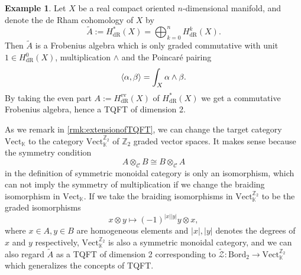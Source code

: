 \documentclass[10pt,reqno,final]{article}
\numberwithin{equation}{section}
\numberwithin{figure}{section}
\numberwithin{table}{section}
\theoremstyle{plain}
\theoremstyle{definition}
\newtheorem{example}[theorem]{Example}
\theoremstyle{remark}
\begin{document}
    \begin{example}\label{exm:dRHomology}
      Let \(X\) be a real compact oriented \(n\)-dimensional manifold, and denote the de Rham cohomology of \(X\) by
      \begin{equation}
        \tilde{A}:=H^{*}_{\text{dR}}(X)=\bigoplus_{k=0}^{n}H_{\text{dR}}^{k}(X).
      \end{equation}
      Then \(\tilde{A}\) is a Frobenius algebra which is only graded commutative with unit \(1\in H^{0}_{\text{dR}}(X)\), multiplication \(\wedge\) and the Poincar\'{e} pairing
      \begin{equation}
        \braket{\alpha,\beta} =\int_{X}\alpha\wedge\beta.
      \end{equation}
      By taking the even part \(A:=H^{\text{ev}}_{\text{dR}}(X)\) of \(H^{*}_{\text{dR}}(X)\) we get a commutative Frobenius algebra, hence a TQFT of dimension 2.

      As we remark in \ref{rmk:extensionofTQFT}, we can change the target category \(\mathrm{Vect}_{\mathbb{K}}\) to the category \(\mathrm{Vect}_{\mathbb{K}}^{\mathbb{Z}_{2}}\) of \(\mathbb{Z}_{2}\) graded vector spaces. It makes sense because the symmetry condition
      \[
        A\otimes_{\mathcal{C}}B\cong B\otimes_{\mathcal{C}} A
      \]
      in the definition of symmetric monoidal category is only an isomorphism, which can not imply the symmetry of multiplication if we change the braiding isomorphism in \(\mathrm{Vect}_{\mathbb{K}}\). If we take the braiding isomorphisms in \(\mathrm{Vect}_{\mathbb{K}}^{\mathbb{Z}_{2}}\) to be the graded isomorphisms
      \begin{equation}
        x\otimes y\mapsto (-1)^{|x||y|}y\otimes x,
      \end{equation}
      where \(x\in A, y\in B\) are homogeneous elements and \(|x|,|y|\) denotes the degrees of \(x\) and \(y\) respectively, \(\mathrm{Vect}_{\mathbb{K}}^{\mathbb{Z}_{2}}\) is also a symmetric monoidal category, and we can also regard \(\tilde{A}\) as a TQFT of dimension 2 corresponding to \(\tilde{\mathcal{Z}}:\mathrm{Bord}_{2}\to \mathrm{Vect}_{\mathbb{K}}^{\mathbb{Z}_{2}}\) which generalizes the concepts of TQFT.
    \end{example}
    
    
    
\end{document}
